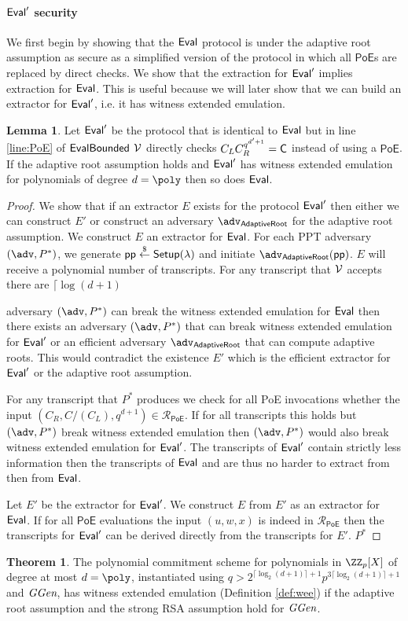 \documentclass{article}
\theoremstyle{definition}
\newtheorem{theorem}{Theorem}
\newtheorem{lemma}{Lemma}
\begin{document}
\paragraph{$\textsf{{Eval}}'$ security}
We first begin by showing that the $\textsf{{Eval}}$ protocol is under the adaptive root assumption as secure as a simplified version of the protocol in which all $\textsf{PoE}$s are replaced by direct checks. We show that the extraction for $\textsf{{Eval}}'$ implies extraction for $\textsf{{Eval}}$. This is useful because we will later show that we can build an extractor for $\textsf{{Eval}}'$, i.e. it has witness extended emulation.
\begin{lemma}
Let $\textsf{{Eval}}'$ be the protocol that is identical to $\textsf{{Eval}}$ but in line \ref{line:PoE} of $\textsf{{EvalBounded}}$ $\mathcal{V}$ directly checks $C_LC_R^{q^{d'+1}}=\mathsf{C}$ instead of using a $\textsf{PoE}$. If the adaptive root assumption holds and $\textsf{{Eval}}'$ has witness extended emulation for polynomials of degree $d=\poly$ then so does $\textsf{{Eval}}$.
\end{lemma}
\begin{proof}
We show that if an extractor $E$ exists for the protocol $\textsf{{Eval}}'$ then either we can construct $E'$ or construct an adversary $\adv_{\textsf{AdaptiveRoot}}$ for the adaptive root assumption. 
We construct $E$ an extractor for $\textsf{{Eval}}$. For each PPT adversary $(\adv,P^*)$, we generate $\textsf{pp}\overset{\$}{\gets} \textsf{{Setup}}(\lambda)$ and initiate $\adv_{\textsf{AdaptiveRoot}}(\crs)$. $E$ will receive a polynomial number of transcripts. For any transcript that $\mathcal{V}$ accepts there are $\lceil \log(d+1) $  

 adversary $(\adv,P^*)$ can break the witness extended emulation for $\textsf{{Eval}}$ then there exists an adversary $(\adv,P^*)$ that can break witness extended emulation for $\textsf{{Eval}}'$ or an efficient adversary $\adv_{\textsf{AdaptiveRoot}}$ that can compute adaptive roots. This would contradict the existence $E'$ which is the efficient extractor for $\textsf{{Eval}}'$ or the adaptive root assumption. 

 For any transcript that $P^*$ produces we check for all \textsf{PoE} invocations whether the input $(C_R,C/(C_L),q^{d+1})\in \mathcal{R}_\textsf{PoE}$. If for all transcripts this holds but $(\adv,P^*)$ break witness extended emulation then $(\adv,P^*)$ would also break witness extended emulation for $\textsf{{Eval}}'$. The transcripts of $\textsf{{Eval}}'$ contain strictly less information then the transcripts of $\textsf{{Eval}}$ and are thus no harder to extract from then from $\textsf{{Eval}}$.


 Let $E'$ be the extractor for $\textsf{{Eval}}'$. We construct $E$ from $E'$ as an extractor for $\textsf{{Eval}}$. If for all $\textsf{PoE}$ evaluations the input $(u,w,x)$ is indeed in $\mathcal{R}_\textsf{PoE}$ then the transcripts for $\textsf{{Eval}}'$ can be derived directly from the transcripts for $E'$. $P^*$
\end{proof}
\begin{theorem}
	The polynomial commitment scheme for polynomials in $\ZZ_p[X]$ of degree at most $d=\poly$, instantiated using $q>2^{\lceil \log_2(d+1) \rceil+1} p^{3 \lceil \log_2(d+1) \rceil+1}$ and $\textit{GGen}$, has witness extended emulation (Definition \ref{def:wee}) if the adaptive root assumption and the strong RSA assumption hold for $\textit{GGen}$.
\end{theorem}
\end{document}
